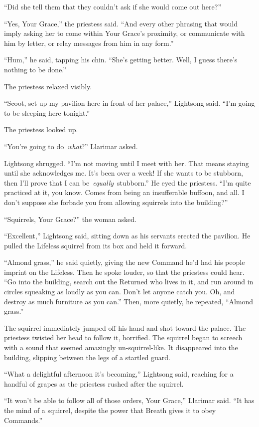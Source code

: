 “Did she tell them that they couldn’t ask if she would come out here?”

“Yes, Your Grace,” the priestess said. “And every other phrasing that would imply asking her to come within Your Grace’s proximity, or communicate with him by letter, or relay messages from him in any form.”

“Hum,” he said, tapping his chin. “She’s getting better. Well, I guess there’s nothing to be done.”

The priestess relaxed visibly.

“Scoot, set up my pavilion here in front of her palace,” Lightsong said. “I’m going to be sleeping here tonight.”

The priestess looked up.

“You’re going to do~\textit{what}?” Llarimar asked.

Lightsong shrugged. “I’m not moving until I meet with her. That means staying until she acknowledges me. It’s been over a week! If she wants to be stubborn, then I’ll prove that I can be~\textit{equally}~stubborn.” He eyed the priestess. “I’m quite practiced at it, you know. Comes from being an insufferable buffoon, and all. I don’t suppose she forbade you from allowing squirrels into the building?”

“Squirrels, Your Grace?” the woman asked.

“Excellent,” Lightsong said, sitting down as his servants erected the pavilion. He pulled the Lifeless squirrel from its box and held it forward.

“Almond grass,” he said quietly, giving the new Command he’d had his people imprint on the Lifeless. Then he spoke louder, so that the priestess could hear. “Go into the building, search out the Returned who lives in it, and run around in circles squeaking as loudly as you can. Don’t let anyone catch you. Oh, and destroy as much furniture as you can.” Then, more quietly, he repeated, “Almond grass.”

The squirrel immediately jumped off his hand and shot toward the palace. The priestess twisted her head to follow it, horrified. The squirrel began to screech with a sound that seemed amazingly un-squirrel-like. It disappeared into the building, slipping between the legs of a startled guard.

“What a delightful afternoon it’s becoming,” Lightsong said, reaching for a handful of grapes as the priestess rushed after the squirrel.

“It won’t be able to follow all of those orders, Your Grace,” Llarimar said. “It has the mind of a squirrel, despite the power that Breath gives it to obey Commands.”

